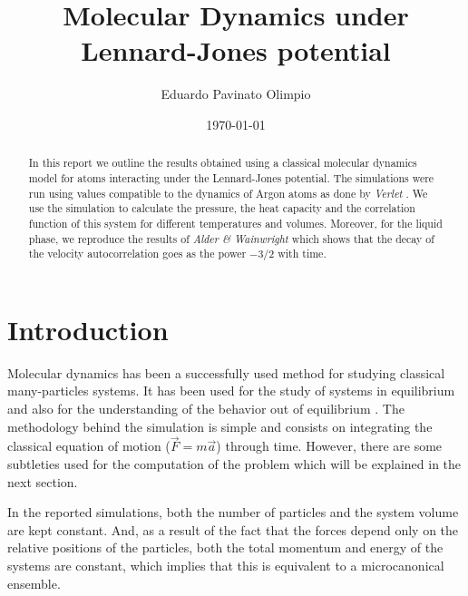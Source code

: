 \documentclass[aps,prl,reprint,groupedaddress]{revtex4-1}
\begin{document}
\title{Molecular Dynamics under Lennard-Jones potential}


\author{Eduardo Pavinato Olimpio}


\date{\today}

\begin{abstract}
	In this report we outline the results obtained using a classical molecular dynamics model for atoms interacting under the Lennard-Jones potential. The simulations were run using values compatible to the dynamics of Argon atoms as done by \textit{Verlet} \cite{Verlet1967}. We use the simulation to calculate the pressure, the heat capacity and the correlation function of this system for different temperatures and volumes. Moreover, for the liquid phase, we reproduce the results of \textit{Alder \& Wainwright} \cite{Alder1970} which shows that the decay of the velocity autocorrelation goes as the power $-3/2$ with time.
\end{abstract}

\maketitle

\section{Introduction}
Molecular dynamics has been a successfully used method for studying classical many-particles systems. It has been used for the study of systems in equilibrium and also for the understanding of the behavior out of equilibrium \cite{RapaportBook}. The methodology behind the simulation is simple and consists on integrating the classical equation of motion ($\vec{F} = m\vec{a}$) through time. However, there are some subtleties used for the computation of the problem which will be explained in the next section.

In the reported simulations, both the number of particles and the system volume are kept constant. And, as a result of the fact that the forces depend only on the relative positions of the particles, both the total momentum and energy of the systems are  constant, which implies that this is equivalent to a microcanonical ensemble.
\end{document}
